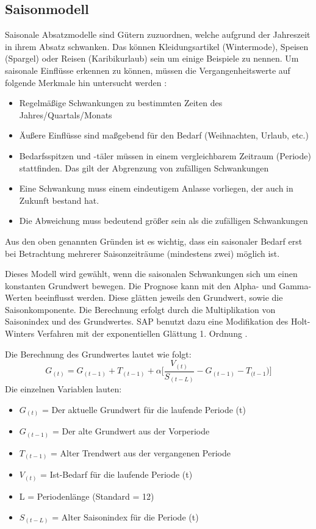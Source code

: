 \subsection{Saisonmodell}
\label{sec:Saisonmodell}
Saisonale Absatzmodelle sind Gütern zuzuordnen, welche aufgrund der Jahreszeit in ihrem Absatz schwanken. Das können Kleidungsartikel (Wintermode), Speisen (Spargel) oder Reisen (Karibikurlaub) sein um einige Beispiele zu nennen.
Um saisonale Einflüsse erkennen zu können, müssen die Vergangenheitswerte auf folgende Merkmale hin untersucht werden \cite[S.~25]{Larouque2010}:
\begin{itemize}
	\item Regelmäßige Schwankungen zu bestimmten Zeiten des Jahres/Quartals/Monats
	\item Äußere Einflüsse sind maßgebend für den Bedarf (Weihnachten, Urlaub, etc.)
	\item Bedarfsspitzen und -täler müssen in einem vergleichbarem Zeitraum (Periode) stattfinden. Das gilt der Abgrenzung von zufälligen Schwankungen
	\item Eine Schwankung muss einem eindeutigem Anlasse vorliegen, der auch in Zukunft bestand hat.
	\item Die Abweichung muss bedeutend größer sein als die zufälligen Schwankungen
\end{itemize}
Aus den oben genannten Gründen ist es wichtig, dass ein saisonaler Bedarf erst bei Betrachtung mehrerer Saisonzeiträume (mindestens zwei) möglich ist.

Dieses Modell wird gewählt, wenn die saisonalen Schwankungen sich um einen konstanten Grundwert bewegen. Die Prognose kann mit den Alpha- und Gamma-Werten beeinflusst werden. Diese glätten jeweils den Grundwert, sowie die Saisonkomponente.
Die Berechnung erfolgt durch die Multiplikation von Saisonindex und des Grundwertes. 
SAP benutzt dazu eine Modifikation des Holt-Winters Verfahren mit der exponentiellen Glättung 1. Ordnung \cite{SAPDOCTSM}.

Die Berechnung des Grundwertes lautet wie folgt:
\begin{equation}
	G_{(t)} = G_{(t-1) }+ T_{(t-1)} + \alpha \big[\dfrac{V_{(t)}}{S_{(t-L)}} - G_{(t-1)} - T_{(t-1}) \big]
\end{equation}
Die einzelnen Variablen lauten:
\begin{itemize}
	\item $G_{(t)}$ = Der aktuelle Grundwert für die laufende Periode (t)
	\item $G_{(t-1)}$ = Der alte Grundwert aus der Vorperiode
	\item $T_{(t-1)}$ = Alter Trendwert aus der vergangenen Periode
	\item $V_{(t)}$ = Ist-Bedarf für die laufende Periode (t)
	\item L = Periodenlänge (Standard = 12)
	\item $S_{(t-L)}$ = Alter Saisonindex für die Periode (t)
\end{itemize}

